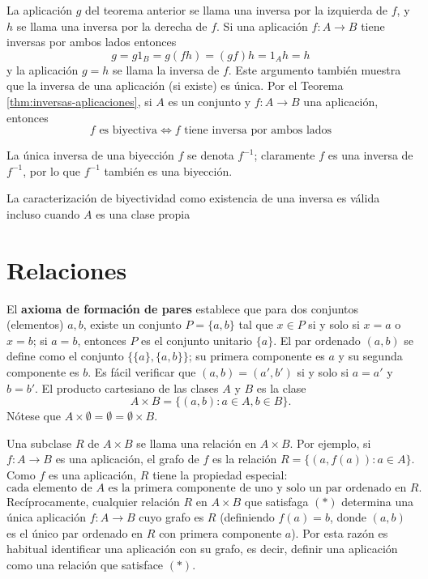 La aplicación \( g \) del teorema anterior se llama una {inversa por la izquierda} de \( f \), y \( h \) se llama una {inversa por la derecha} de \( f \). Si una aplicación \( f: A \to B \) tiene inversas por ambos lados entonces
\[
g = g1_B = g(fh) = (gf)h = 1_A h = h
\]
y la aplicación \( g = h \) se llama la {inversa} de \( f \). Este argumento también muestra que la inversa de una aplicación (si existe) es única. Por el Teorema \ref{thm:inversas-aplicaciones}, si \( A \) es un conjunto y \( f: A \to B \) una aplicación, entonces
\[
f \text{ es biyectiva} \iff f \text{ tiene inversa por ambos lados}
\]

La única inversa de una biyección \( f \) se denota \( f^{-1} \); claramente \( f \) es una inversa de \( f^{-1} \), por lo que \( f^{-1} \) también es una biyección.

\begin{remark}
    La caracterización de biyectividad como existencia de una inversa es válida incluso cuando \( A \) es una clase propia
\end{remark}

\section{Relaciones}

El \textbf{axioma de formación de pares} establece que para dos conjuntos (elementos) \( a, b \), existe un conjunto \( P = \{a, b\} \) tal que \( x \in P \) si y solo si \( x = a \) o \( x = b \); si \( a = b \), entonces \( P \) es el {conjunto unitario} \( \{a\} \). El {par ordenado} \( (a, b) \) se define como el conjunto \( \{\{a\}, \{a, b\}\} \); su {primera componente} es \( a \) y su {segunda componente} es \( b \). Es fácil verificar que \( (a, b) = (a', b') \) si y solo si \( a = a' \) y \( b = b' \). El {producto cartesiano} de las clases \( A \) y \( B \) es la clase
\[
A \times B = \{(a, b) : a \in A, b \in B\}.
\]
Nótese que \( A \times \emptyset = \emptyset = \emptyset \times B \).

Una subclase \( R \) de \( A \times B \) se llama una {relación} en \( A \times B \). Por ejemplo, si \( f: A \to B \) es una aplicación, el grafo de \( f \) es la relación \( R = \{(a, f(a)) : a \in A\} \). Como \( f \) es una aplicación, \( R \) tiene la propiedad especial:
\[
\text{cada elemento de } A \text{ es la primera componente de uno y solo un par ordenado en } R. \tag{$*$}
\]
Recíprocamente, cualquier relación \( R \) en \( A \times B \) que satisfaga $(*)$ determina una única aplicación \( f: A \to B \) cuyo grafo es \( R \) (definiendo \( f(a) = b \), donde \( (a, b) \) es el único par ordenado en \( R \) con primera componente \( a \)). Por esta razón es habitual identificar una aplicación con su grafo, es decir, definir una aplicación como una relación que satisface $(*)$.

